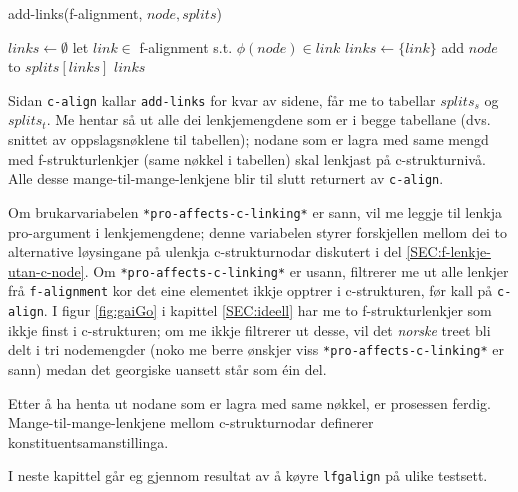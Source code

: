\documentclass[12pt,a4paper,oneside,draft]{report}
\begin{document}
   \begin{algorithm}[htbp]
   \caption{add-links(f-alignment, $node, splits$)}
   \label{algo:add-links}
      
        $links \gets \emptyset$\;
    {
        {
          let $link \in$ f-alignment s.t. $\phi(node) \in link$ \;
           {$links \gets \{link\}$} \;
           {
          }
        }
        add $node$ to $splits[links]$ \;
       }
        \Return $links$ \;
  \end{algorithm}

Sidan \texttt{c-align} kallar \texttt{add-links} for kvar av sidene, får me to
 tabellar $splits_s$ og $splits_t$.  Me hentar så ut alle dei
 lenkjemengdene som er i begge tabellane (dvs. snittet av
 oppslagsnøklene til tabellen); nodane som er lagra med same mengd med
 f\hyp{}strukturlenkjer (same nøkkel i tabellen) skal lenkjast på
 c\hyp{}strukturnivå. Alle desse mange-til-mange-lenkjene blir til slutt
 returnert av \texttt{c-align}.

 Om brukarvariabelen \texttt{*pro-affects-c-linking*} er sann, vil me leggje
 til lenkja pro\hyp{}argument i lenkjemengdene; denne variabelen
 styrer forskjellen mellom dei to alternative løysingane på ulenkja
 c\hyp{}strukturnodar diskutert i del
 \ref{SEC:f-lenkje-utan-c-node}. Om \texttt{*pro-affects-c-linking*} er
 usann, filtrerer me ut alle lenkjer frå \texttt{f-alignment} kor det eine
 elementet ikkje opptrer i c\hyp{}strukturen, før kall på \texttt{c-align}.
 I figur \ref{fig:gaiGo} i kapittel \ref{SEC:ideell} har me to
 f\hyp{}strukturlenkjer som ikkje finst i c\hyp{}strukturen; om me
 ikkje filtrerer ut desse, vil det \emph{norske} treet bli delt i tri
 nodemengder (noko me berre ønskjer viss \texttt{*pro-affects-c-linking*} er
 sann) medan det georgiske uansett står som éin del.

Etter å ha henta ut nodane som er lagra med same nøkkel, er prosessen
 ferdig. Mange-til-mange-lenkjene mellom c\hyp{}strukturnodar definerer
 konstituentsamanstillinga.

I neste kapittel går eg gjennom resultat av å køyre \texttt{lfgalign} på
 ulike testsett.
\end{document}
